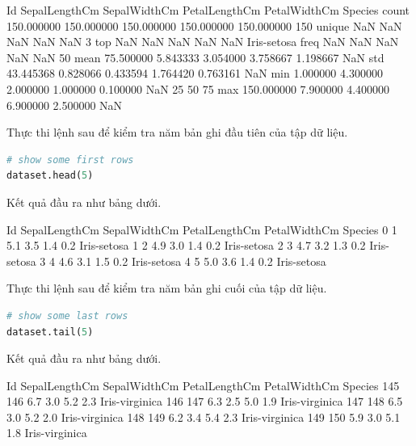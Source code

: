 \begin{terminal}
       Id         SepalLengthCm SepalWidthCm PetalLengthCm PetalWidthCm Species
count  150.000000 150.000000    150.000000   150.000000    150.000000   150
unique NaN        NaN           NaN          NaN           NaN          3
top    NaN        NaN           NaN          NaN           NaN          Iris-setosa
freq   NaN        NaN           NaN          NaN           NaN          50
mean   75.500000  5.843333      3.054000     3.758667      1.198667     NaN
std    43.445368  0.828066      0.433594     1.764420      0.763161     NaN
min    1.000000   4.300000      2.000000     1.000000      0.100000     NaN
25%
50%
75%
max    150.000000 7.900000      4.400000     6.900000      2.500000     NaN
\end{terminal}

Thực thi lệnh sau để kiểm tra năm bản ghi đầu tiên của tập dữ liệu.

\begin{lstlisting}[language=Python]
# show some first rows
dataset.head(5)
\end{lstlisting}

Kết quả đầu ra như bảng dưới.

\begin{terminal}
  Id SepalLengthCm SepalWidthCm PetalLengthCm PetalWidthCm Species
0 1  5.1           3.5          1.4           0.2          Iris-setosa
1 2  4.9           3.0          1.4           0.2          Iris-setosa
2 3  4.7           3.2          1.3           0.2          Iris-setosa
3 4  4.6           3.1          1.5           0.2          Iris-setosa
4 5  5.0           3.6          1.4           0.2          Iris-setosa
\end{terminal}

Thực thi lệnh sau để kiểm tra năm bản ghi cuối của tập dữ liệu.

\begin{lstlisting}[language=Python]
# show some last rows
dataset.tail(5)
\end{lstlisting}

Kết quả đầu ra như bảng dưới.

\begin{terminal}
    Id  SepalLengthCm SepalWidthCm PetalLengthCm PetalWidthCm Species
145 146 6.7           3.0          5.2           2.3          Iris-virginica
146 147 6.3           2.5          5.0           1.9          Iris-virginica
147 148 6.5           3.0          5.2           2.0          Iris-virginica
148 149 6.2           3.4          5.4           2.3          Iris-virginica
149 150 5.9           3.0          5.1           1.8          Iris-virginica
\end{terminal}

